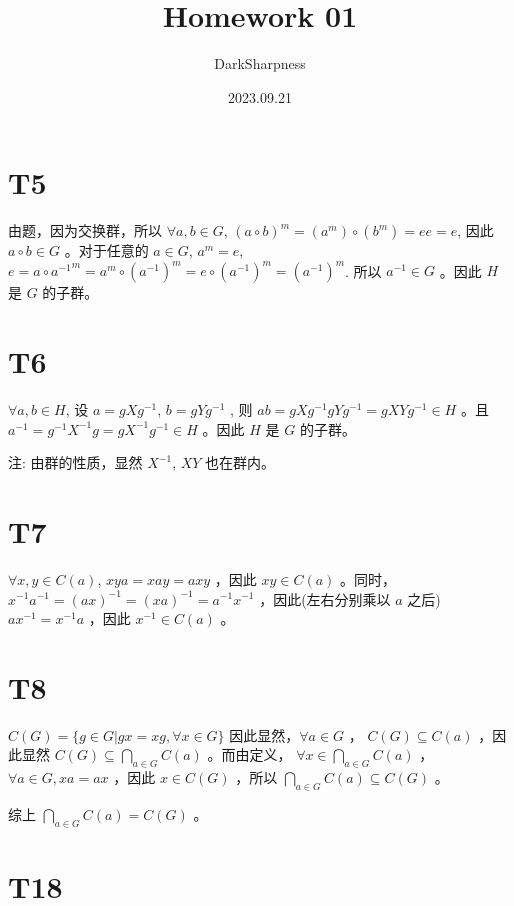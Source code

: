 \documentclass[fontset=windows]{article}
\title{\heiti\zihao{2} Homework 01}
\author{DarkSharpness}
\date{2023.09.21}
\begin{document}
	\maketitle
    \tableofcontents


\section*{T5}

由题，因为交换群，所以 $\forall a,b \in G $, $(a \circ b) ^ m = (a ^ m) \circ (b ^ m) = e e = e$, 因此 $a \circ b \in G$ 。对于任意的 $a \in G$, $a ^ m = e$,  $e = {a \circ a ^ {-1}} ^ m = a ^ m \circ (a ^ {-1}) ^ m = e \circ (a ^ {-1}) ^ m = (a ^ {-1}) ^ m$. 所以 $a ^ {-1} \in G$ 。因此 $H$ 是 $G$ 的子群。

\section*{T6}

$\forall a,b \in H$, 设 $a = gXg^{-1}$, $b = gYg^{-1}$ , 则 $ab = gXg^{-1}gYg^{-1} = gXYg^{-1} \in H$ 。且 $ a ^ {-1} = g ^ {-1} X ^ {-1} g = gX ^ {-1} g ^ {-1} \in H$ 。因此 $H$ 是 $G$ 的子群。

注: 由群的性质，显然 $X^{-1}$, $XY$ 也在群内。


\section*{T7}

$\forall x,y \in C(a)$, $xya = xay = axy$ ，因此 $xy \in C(a)$ 。同时， $ x ^{-1} a ^{-1} = (ax)^{-1} = (xa)^{-1} = a^{-1}x^{-1}$ ，因此(左右分别乘以 $a$ 之后) $a x^{-1} = x^{-1} a$ ，因此 $x^{-1} \in C(a)$ 。

\section*{T8}

$C(G) = \{g \in G | gx = xg, \forall x \in G\}$ 因此显然，$\forall a \in G$ ， $ C(G) \subseteq C(a)$ ，因此显然 $C(G) \subseteq \bigcap\limits_{a\in G} C(a)$ 。而由定义， $\forall x \in \bigcap\limits_{a\in G} C(a)
$ ， $\forall a \in G , xa = ax$ ，因此 $x \in C(G)$ ，所以 $\bigcap\limits_{a\in G} C(a) \subseteq C(G)$ 。

综上 $\bigcap\limits_{a\in G} C(a) = C(G)$ 。

\section*{T18}
\end{document}

